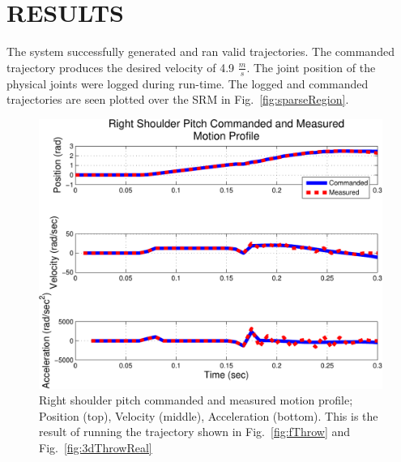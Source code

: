 \section{RESULTS}\label{sec:reslts}
The system successfully generated and ran valid trajectories.  The commanded trajectory produces the desired velocity of 4.9 $\frac{m}{s}$.  The joint position of the physical joints were logged during run-time.  
The logged and commanded trajectories are seen plotted over the SRM in Fig.~\ref{fig:sparseRegion}.  


\begin{figure}[thpb]
  \centering
\includegraphics[width=1.0\columnwidth]{./MATLAB/throwTrajRSPplot.pdf}
  \caption{Right shoulder pitch commanded and measured motion profile; Position (top), Velocity (middle), Acceleration (bottom).  This is the result of running the trajectory shown in Fig.~\ref{fig:fThrow} and Fig.~\ref{fig:3dThrowReal}}
  \label{fig:velosPlot}
\end{figure}


